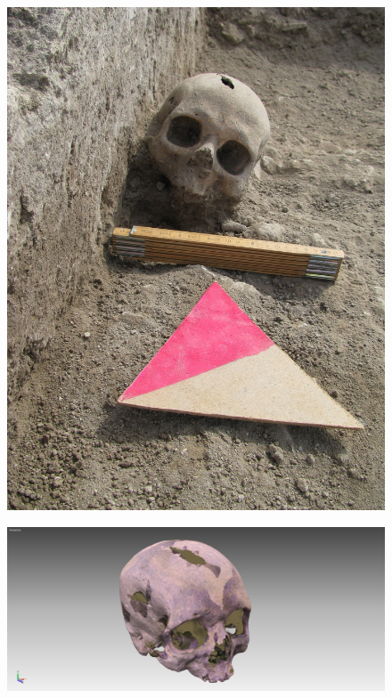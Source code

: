 \documentclass{beamer}
\begin{document}
		\begin{frame}
			\begin{multicols}{2}[][]
				\begin{figure}[]
					\begin{center}
						\includegraphics[width=1\linewidth,trim=0 200 0 0,clip=true]{snap3d/cranio1}
					\end{center}
					\label{fig:cranio1}
				\end{figure}
				\begin{figure}[]
					\begin{center}
						\includegraphics[width=1\linewidth,trim=150 0 150 0,clip=true]{snap3d/cranio2}
					\end{center}
					\label{fig:cranio2}
				\end{figure}
			\end{multicols}
		\end{frame}
\end{document}
